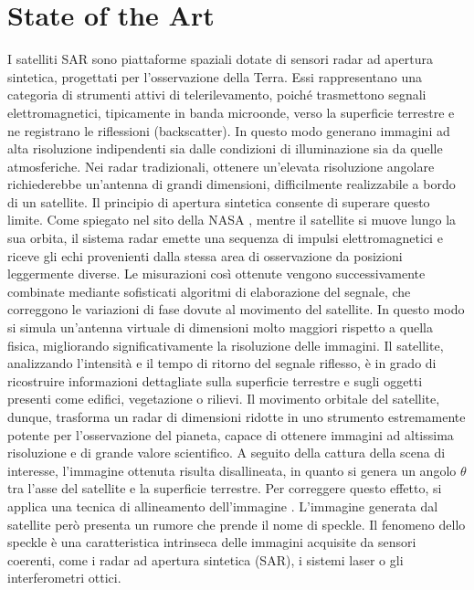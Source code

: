 \chapter{State of the Art}
I satelliti SAR sono piattaforme spaziali dotate di sensori radar ad apertura sintetica, 
progettati per l’osservazione della Terra. Essi rappresentano una categoria di strumenti attivi di telerilevamento, 
poiché trasmettono segnali elettromagnetici, tipicamente in banda microonde, verso la superficie terrestre e ne 
registrano le riflessioni (backscatter). In questo modo generano immagini ad alta risoluzione indipendenti sia 
dalle condizioni di illuminazione sia da quelle atmosferiche.
Nei radar tradizionali, ottenere un’elevata risoluzione angolare richiederebbe un’antenna di grandi dimensioni, 
difficilmente realizzabile a bordo di un satellite. Il principio di apertura sintetica consente di superare questo limite. 
Come spiegato nel sito della NASA \cite{nasa_sar}, mentre il satellite si muove lungo la sua orbita, 
il sistema radar emette una sequenza di impulsi elettromagnetici e riceve gli echi provenienti dalla 
stessa area di osservazione da posizioni leggermente diverse.
Le misurazioni così ottenute vengono successivamente combinate mediante sofisticati algoritmi di elaborazione del segnale, 
che correggono le variazioni di fase dovute al movimento del satellite. In questo modo si simula un’antenna virtuale 
di dimensioni molto maggiori rispetto a quella fisica, migliorando significativamente la risoluzione delle immagini.
Il satellite, analizzando l’intensità e il tempo di ritorno del segnale riflesso, è in grado di ricostruire informazioni 
dettagliate sulla superficie terrestre e sugli oggetti presenti come edifici, vegetazione o rilievi. Il movimento 
orbitale del satellite, dunque, trasforma un radar di dimensioni ridotte in uno strumento estremamente potente per 
l’osservazione del pianeta, capace di ottenere immagini ad altissima risoluzione e di grande valore scientifico.
A seguito della cattura della scena di interesse, l’immagine ottenuta risulta disallineata, 
in quanto si genera un angolo $\theta$ tra l’asse del satellite e la superficie terrestre. 
Per correggere questo effetto, si applica una tecnica di allineamento dell’immagine \cite{HUGHES2020166}.
L'immagine generata dal satellite però presenta un rumore che prende il nome di speckle.   
Il fenomeno dello speckle è una caratteristica intrinseca delle immagini acquisite da sensori coerenti, 
come i radar ad apertura sintetica (SAR), i sistemi laser o gli interferometri ottici. 
